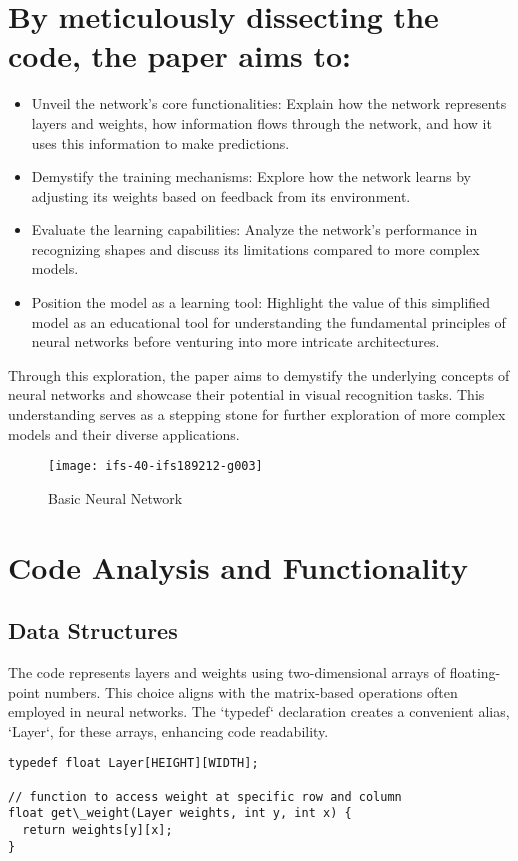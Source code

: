 \documentclass{article}
\begin{document}
\section*{By meticulously dissecting the code, the paper aims to:}
\begin{itemize}
    \item Unveil the network's core functionalities: Explain how the network represents layers and weights, how information flows through the network, and how it uses this information to make predictions.
    \item Demystify the training mechanisms: Explore how the network learns by adjusting its weights based on feedback from its environment.
    \item Evaluate the learning capabilities: Analyze the network's performance in recognizing shapes and discuss its limitations compared to more complex models.
    \item Position the model as a learning tool: Highlight the value of this simplified model as an educational tool for understanding the fundamental principles of neural networks before venturing into more intricate architectures.
\end{itemize}
Through this exploration, the paper aims to demystify the underlying concepts of neural networks and showcase their potential in visual recognition tasks. This understanding serves as a stepping stone for further exploration of more complex models and their diverse applications.

\begin{figure}[H]  
  \centering
  \texttt{[image: ifs-40-ifs189212-g003]}  
  \caption{Basic Neural Network}  
\end{figure}

\section{Code Analysis and Functionality}

\subsection{Data Structures}
The code represents layers and weights using two-dimensional arrays of floating-point numbers. This choice aligns with the matrix-based operations often employed in neural networks. The `typedef` declaration creates a convenient alias, `Layer`, for these arrays, enhancing code readability.

\lstset{language=C, breaklines=true, basicstyle=\ttfamily}
\begin{lstlisting}
typedef float Layer[HEIGHT][WIDTH];

// function to access weight at specific row and column
float get\_weight(Layer weights, int y, int x) {
  return weights[y][x];
}
\end{lstlisting}
\end{document}
